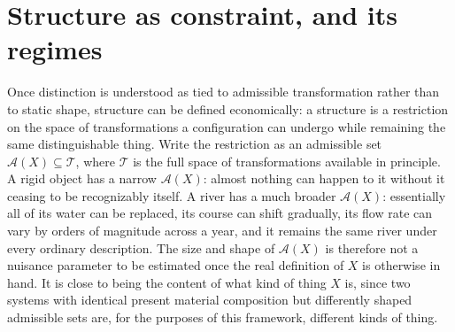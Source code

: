 \documentclass[11pt]{article}
\begin{document}
\section{Structure as constraint, and its regimes}

Once distinction is understood as tied to admissible transformation rather than to static shape, structure can be defined economically: a structure is a restriction on the space of transformations a configuration can undergo while remaining the same distinguishable thing. Write the restriction as an admissible set $\mathcal{A}(X) \subseteq \mathcal{T}$, where $\mathcal{T}$ is the full space of transformations available in principle. A rigid object has a narrow $\mathcal{A}(X)$: almost nothing can happen to it without it ceasing to be recognizably itself. A river has a much broader $\mathcal{A}(X)$: essentially all of its water can be replaced, its course can shift gradually, its flow rate can vary by orders of magnitude across a year, and it remains the same river under every ordinary description. The size and shape of $\mathcal{A}(X)$ is therefore not a nuisance parameter to be estimated once the real definition of $X$ is otherwise in hand. It is close to being the content of what kind of thing $X$ is, since two systems with identical present material composition but differently shaped admissible sets are, for the purposes of this framework, different kinds of thing.
\end{document}

